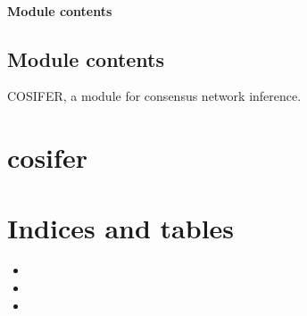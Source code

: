 \documentclass[letterpaper,10pt,english]{sphinxmanual}
\begin{document}
\subsubsection{Module contents}
\label{\detokenize{_modules/cosifer.utils:module-cosifer.utils}}\label{\detokenize{_modules/cosifer.utils:module-contents}}

\section{Module contents}
\label{\detokenize{_modules/cosifer:module-cosifer}}\label{\detokenize{_modules/cosifer:module-contents}}
COSIFER, a module for consensus network inference.


\chapter{cosifer}
\label{\detokenize{_modules/modules:cosifer}}\label{\detokenize{_modules/modules::doc}}

\chapter{Indices and tables}
\label{\detokenize{index:indices-and-tables}}\begin{itemize}
\item {} 

\item {} 

\item {} 

\end{itemize}
\end{document}
